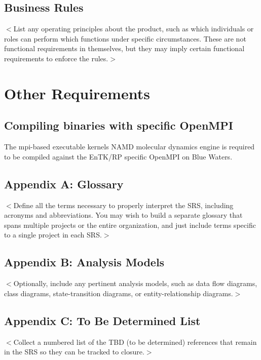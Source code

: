 \documentclass{scrreprt}
\begin{document}
\section{Business Rules}
$<$List any operating principles about the product, such as which individuals or 
roles can perform which functions under specific circumstances. These are not 
functional requirements in themselves, but they may imply certain functional 
requirements to enforce the rules.$>$


\chapter{Other Requirements}

\section{Compiling binaries with specific OpenMPI}

The mpi-based executable kernels NAMD molecular dynamics engine is required to be compiled against the EnTK/RP specific OpenMPI on Blue Waters.


\section{Appendix A: Glossary}
$<$Define all the terms necessary to properly interpret the SRS, including 
acronyms and abbreviations. You may wish to build a separate glossary that spans 
multiple projects or the entire organization, and just include terms specific to 
a single project in each SRS.$>$

\section{Appendix B: Analysis Models}
$<$Optionally, include any pertinent analysis models, such as data flow 
diagrams, class diagrams, state-transition diagrams, or entity-relationship 
diagrams.$>$

\section{Appendix C: To Be Determined List}
$<$Collect a numbered list of the TBD (to be determined) references that remain 
in the SRS so they can be tracked to closure.$>$
\end{document}
